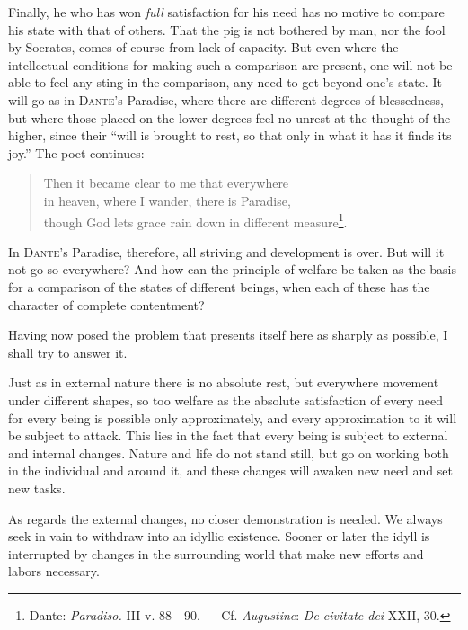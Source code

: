 \documentclass[12pt,a4paper,openany]{book}
\newcommand{\opage}[1]{\marginnote{\footnotesize\textit{[#1]}}}
\begin{document}
Finally, he who has won \textit{full} satisfaction for his need has no motive to compare his state with
that of others. That the pig is not bothered by man, nor the fool by Socrates, comes of course from lack of
capacity. But even where the intellectual conditions for making such a comparison are present, one will
not be able to feel any sting in the comparison, any need to get beyond one's state. It will go as in
\textsc{Dante}'s Paradise, where there are different degrees of blessedness, but where those placed on the
lower degrees feel no unrest at the thought of the higher, since their ``will is brought to rest, so that
only in what it has it finds its joy.'' The poet continues:

\begin{quote}
Then it became clear to me that everywhere\\
in heaven, where I wander, there is Paradise,\\
though God lets grace rain down in different measure\footnote[1]{Dante: \textit{Paradiso.} III v.
88---90. --- Cf. \emph{Augustine}: \textit{De civitate dei} XXII, 30.}.
\end{quote}

In \textsc{Dante}'s Paradise, therefore, all striving and development is over. But will it not go so
everywhere? And how can the principle of welfare be taken as the basis for a comparison of the states of
different
\opage{142}beings, when each of these has the character of complete contentment?

Having now posed the problem that presents itself here as sharply as possible, I shall try to answer it.

Just as in external nature there is no absolute rest, but everywhere movement under different shapes, so
too welfare as the absolute satisfaction of every need for every being is possible only approximately, and
every approximation to it will be subject to attack. This lies in the fact that every being is subject to
external and internal changes. Nature and life do not stand still, but go on working both in the
individual and around it, and these changes will awaken new need and set new tasks.

As regards the external changes, no closer demonstration is needed. We always seek in vain to withdraw
into an idyllic existence. Sooner or later the idyll is interrupted by changes in the surrounding world
that make new efforts and labors necessary.
\end{document}
